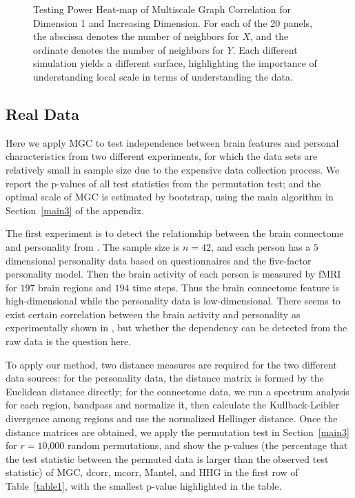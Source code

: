 \documentclass[11pt]{article}
\begin{document}
\begin{figure}[htbp]
{}
\caption{Testing Power Heat-map of Multiscale Graph Correlation for Dimension 1 and Increasing Dimension.
For each of the 20 panels, the abscissa denotes the number of neighbors for $X$, and the ordinate denotes the number of neighbors for $Y$.  Each different simulation yields a different surface, highlighting the importance of understanding local scale in terms of understanding the data.}
\label{figSim2}
\end{figure}

\subsection{Real Data}
\label{numer3}
Here we apply MGC to test independence between brain features and personal characteristics from two different experiments, for which the data sets are relatively small in sample size due to the expensive data collection process. We report the p-values of all test statistics from the permutation test; and the optimal scale of MGC is estimated by bootstrap, using the main algorithm in Section~\ref{main3} of the appendix.

The first experiment is to detect the relationship between the brain connectome and personality from \cite{AdelsteinEtAl2011}. The sample size is $n=42$, and each person has a $5$ dimensional personality data based on questionnaires and the five-factor personality model. Then the brain activity of each person is measured by fMRI for $197$ brain regions and $194$ time steps. Thus the brain connectome feature is high-dimensional while the personality data is low-dimensional. There seems to exist certain correlation between the brain activity and personality as experimentally shown in \cite{AdelsteinEtAl2011}, but whether the dependency can be detected from the raw data is the question here.

To apply our method, two distance measures are required for the two different data sources: for the personality data, the distance matrix is formed by the Euclidean distance directly; for the connectome data, we run a spectrum analysis for each region, bandpass and normalize it, then calculate the Kullback-Leibler divergence among regions and use the normalized Hellinger distance. Once the distance matrices are obtained, we apply the permutation test in Section~\ref{main3} for $r=10$,$000$ random permutations, and show the p-values (the percentage that the test statistic between the permuted data is larger than the observed test statistic) of MGC, dcorr, mcorr, Mantel, and HHG in the first row of Table~\ref{table1}, with the smallest p-value highlighted in the table.
\end{document}
